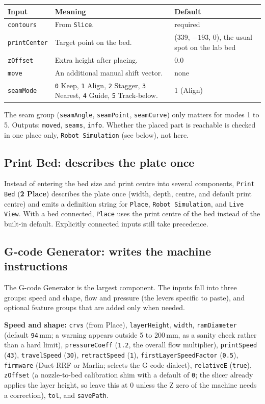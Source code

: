 \documentclass[11pt]{article}
\newcommand{\param}[1]{\texttt{#1}}
\begin{document}
\begin{longtable}{@{}p{2.8cm}p{5.2cm}p{4.2cm}@{}}
\toprule
\textbf{Input} & \textbf{Meaning} & \textbf{Default} \\
\midrule
\endhead
\param{contours} & From \param{Slice}. & required \\
\param{printCenter} & Target point on the bed. & (339, $-193$, 0), the usual spot on the lab bed \\
\param{zOffset} & Extra height after placing. & 0.0 \\
\param{move} & An additional manual shift vector. & none \\
\param{seamMode} & \param{0} Keep, \param{1} Align, \param{2} Stagger, \param{3} Nearest, \param{4} Guide, \param{5} Track-below. & 1 (Align) \\
\bottomrule
\end{longtable}

The seam group (\param{seamAngle}, \param{seamPoint},
\param{seamCurve}) only matters for modes 1 to 5. Outputs:
\param{moved}, \param{seams}, \param{info}. Whether the placed part is
reachable is checked in one place only, \param{Robot Simulation}
(see below), not here.

\subsection{Print Bed: describes the plate once}

Instead of entering the bed size and print centre into several
components, \param{Print Bed} (\textbf{2 Place}) describes the
plate once (width, depth, centre, and default print centre) and emits a
definition string for \param{Place}, \param{Robot
Simulation}, and \param{Live View}. With a bed connected,
\param{Place} uses the print centre of the bed instead of the
built-in default. Explicitly connected inputs still take precedence.

\subsection{G-code Generator: writes the machine instructions}

The G-code Generator is the largest component. The inputs fall into
three groups: speed and shape, flow and pressure (the levers specific
to paste), and optional feature groups that are added only when needed.

\textbf{Speed and shape:} \param{crvs} (from Place), \param{layerHeight},
\param{width}, \param{ramDiameter} (default \param{94}\,mm; a warning
appears outside 5 to 200\,mm, as a sanity check rather than a hard
limit), \param{pressureCoeff} (\param{1.2}, the overall flow
multiplier), \param{printSpeed} (\param{43}), \param{travelSpeed}
(\param{30}), \param{retractSpeed} (\param{1}),
\param{firstLayerSpeedFactor} (\param{0.5}), \param{firmware} (Duet-RRF
or Marlin; selects the G-code dialect), \param{relativeE}
(\param{true}), \param{zOffset} (a nozzle-to-bed calibration shim with
a default of \param{0}; the slicer already applies the layer height, so
leave this at 0 unless the Z zero of the machine needs a correction),
\param{tol}, and \param{savePath}.
\end{document}
